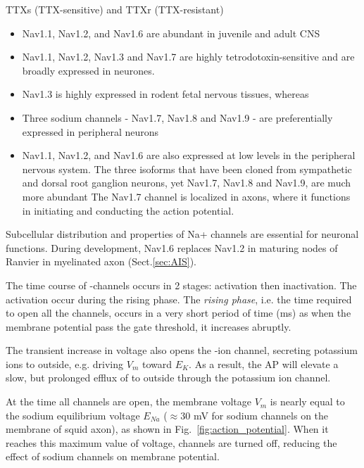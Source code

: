 TTXs (TTX-sensitive) and TTXr (TTX-resistant)
\begin{itemize}

  \item  Nav1.1, Nav1.2, and Nav1.6 are abundant in juvenile and adult CNS
  
  \item Nav1.1, Nav1.2, Nav1.3 and Nav1.7 are highly tetrodotoxin-sensitive and
  are broadly expressed in neurones.
  
  \item  Nav1.3 is highly expressed in rodent fetal nervous tissues, whereas
  
  \item Three sodium channels - Nav1.7, Nav1.8 and Nav1.9 - are preferentially
  expressed in peripheral neurons

   \item Nav1.1, Nav1.2, and Nav1.6 are also expressed at low levels in the peripheral
   nervous system. The three isoforms that have been cloned from sympathetic and
   dorsal root ganglion neurons, yet Nav1.7, Nav1.8 and Nav1.9, are much more
   abundant The Nav1.7 channel is localized in axons, where it functions in
   initiating and conducting the action potential. 
     
\end{itemize}
Subcellular distribution and properties of Na+ channels are essential for
neuronal functions. During development, Nav1.6 replaces Nav1.2 in maturing nodes
of Ranvier in myelinated axon (Sect.\ref{sec:AIS}).

The time course of -channels occurs in 2 stages: activation
then inactivation. The activation occur during the rising phase. The
{\it rising phase}, i.e. the time required to open all the 
channels, occurs in a very short period of time (ms) as when the
membrane potential pass the gate threshold, it increases abruptly. 

\begin{mdframed}
The transient increase in voltage also opens the -ion channel, secreting
potassium ions to outside, e.g. driving $V_m$ toward $E_K$. As a result, the AP
will elevate a slow, but prolonged efflux of  to outside through the
potassium ion channel.
\end{mdframed}

At the time all  channels are open, the membrane voltage $V_m$ is nearly
equal to the sodium equilibrium voltage $E_{Na}$ ($\approx 30$ mV for
sodium channels on the membrane of squid axon), as shown in
Fig.~\ref{fig:action_potential}. When it reaches this maximum value of voltage,
 channels are turned off, reducing the effect of sodium channels on
membrane potential.

